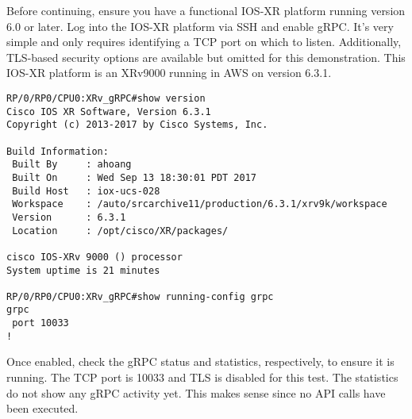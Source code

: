 Before continuing, ensure you have a functional IOS-XR platform running
version 6.0 or later. Log into the IOS-XR platform via SSH and enable gRPC.
It's very simple and only requires identifying a TCP port on which to listen.
Additionally, TLS-based security options are available but omitted for this
demonstration. This IOS-XR platform is an XRv9000 running in AWS on version 6.3.1.

\begin{verbatim}
RP/0/RP0/CPU0:XRv_gRPC#show version                  
Cisco IOS XR Software, Version 6.3.1
Copyright (c) 2013-2017 by Cisco Systems, Inc.

Build Information:
 Built By     : ahoang
 Built On     : Wed Sep 13 18:30:01 PDT 2017
 Build Host   : iox-ucs-028
 Workspace    : /auto/srcarchive11/production/6.3.1/xrv9k/workspace
 Version      : 6.3.1
 Location     : /opt/cisco/XR/packages/

cisco IOS-XRv 9000 () processor 
System uptime is 21 minutes

RP/0/RP0/CPU0:XRv_gRPC#show running-config grpc 
grpc
 port 10033
!
\end{verbatim}

Once enabled, check the gRPC status and statistics, respectively, to ensure it
is running. The TCP port is 10033 and TLS is disabled for this test. The
statistics do not show any gRPC activity yet. This makes sense since no API
calls have been executed.

